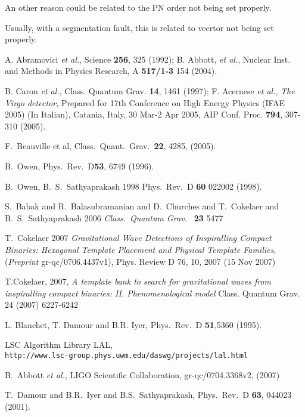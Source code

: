 \documentclass[a4paper,10pt]{article}
\begin{document}
An other reason could be related to the PN order not being set properly.

Usually, with a segmentation fault, this is related to vecrtor not being set properly.


\begin{thebibliography}{99}
A. Abramovici {\it et al.}, Science {\bf 256}, 325 (1992);
B. Abbott, {\it et al.}, Nuclear Inst. and Methods in Physics 
Research, A {\bf 517/1-3} 154 (2004).

B. Caron {\it et al.}, Class. Quantum Grav. {\bf 14}, 1461 (1997);
F. Acernese {\it et al.}, {\em The Virgo detector,} 
Prepared for 17th Conference on High Energy Physics (IFAE 2005) (In Italian), 
Catania, Italy, 30 Mar-2 Apr 2005,  AIP Conf. Proc. {\bf 794}, 307-310 (2005).

F.~Beauville et al, Class.\ Quant.\ Grav.\ \textbf{22}, 4285, (2005).

B.~Owen, Phys.\ Rev.\  D\textbf {53}, 6749 (1996).

 B.~Owen, B.~S.~Sathyaprakash 1998 Phys.\ Rev.\ 
D \textbf{60} 022002 (1998).

S.~Babak and R.~Balasubramanian and D.~Churches and T.~Cokelaer and B.~S.~Sathyaprakash 2006 \textit{Class.\ Quantum Grav.\ }
\textbf{23} 5477

 T.~Cokelaer 2007 \textit{Gravitational Wave Detections of Inspiralling Compact Binaries: Hexagonal Template Placement and Physical Template Families}, (\textit{Preprint} gr-qc/0706.4437v1), Phys. Review D 76, 10, 2007 (15 Nov 2007) 


 T.Cokelaer, 2007, \textit{A template bank to search for gravitational waves from inspiralling compact binaries: II. Phenomenological model}
Class. Quantum Grav. 24 (2007) 6227-6242 


 L. Blanchet, T. Damour and B.R. Iyer, Phys.\ Rev.\ D {\bf 51},5360 (1995).

 LSC Algorithm Library LAL,\\
{\tt http://www.lsc-group.phys.uwm.edu/daswg/\-projects/lal.html}

B.~Abbott {\it et al.}, LIGO Scientific Collaboration, gr-qc/0704.3368v2,
(2007)

T.~Damour and B.R.~Iyer and B.S.~Sathyaprakash, Phys.\ Rev.\ D
\textbf{63}, 044023 (2001).

\end{thebibliography}


\label{theend}
\end{document}
